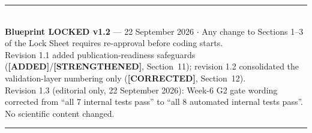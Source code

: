 \documentclass[11pt,a4paper]{article}
\newcommand{\ADDED}{{\color{addcol}\textbf{[ADDED]}}}
\newcommand{\STR}{{\color{strcol}\textbf{[STRENGTHENED]}}}
\newcommand{\COR}{{\color{corcol}\textbf{[CORRECTED]}}}
\begin{document}
\vspace{0.4cm}
\begin{center}
{\color{accent}\rule{0.85\textwidth}{0.8pt}}\\[0.3cm]
{\footnotesize \textbf{Blueprint LOCKED v1.2} --- 22 September 2026 \quad$\cdot$\quad
Any change to Sections 1--3 of the Lock Sheet requires re-approval before coding starts.\\[0.1cm]
Revision 1.1 added publication-readiness safeguards (\ADDED/\STR, Section~11); revision 1.2 consolidated the validation-layer numbering only (\COR, Section~12).\\[0.1cm]
Revision 1.3 (editorial only, 22 September 2026): Week-6 G2 gate wording corrected from ``all 7 internal tests pass'' to ``all 8 automated internal tests pass''. No scientific content changed.}\\[0.2cm]
{\color{accent}\rule{0.85\textwidth}{0.8pt}}
\end{center}
\end{document}
